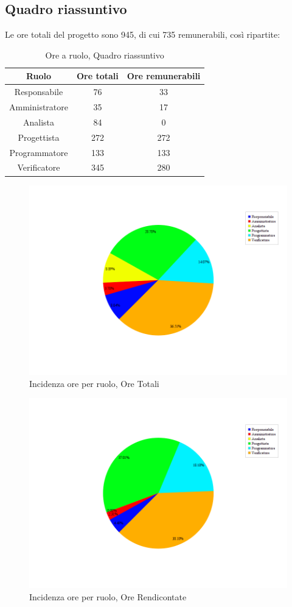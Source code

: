 \subsection{Quadro riassuntivo}
Le ore totali del progetto sono 945, di cui 735 remunerabili, così ripartite:
\begin{table}[H]
	\begin{center}
		\begin{tabular}{|c|c|c|}
			\hline
			\textbf{Ruolo}	& \textbf{Ore totali} & \textbf{Ore remunerabili} \\
			\hline
			Responsabile	&	76	&	33	\\
			\hline
			Amministratore	&	35	&	17	\\
			\hline
			Analista		&	84	&	0	\\
			\hline
			Progettista		&	272	&	272	\\
			\hline
			Programmatore	&	133	&	133	\\
			\hline
			Verificatore	&	345	&	280	\\
			\hline
		\end{tabular}
	\end{center}
	\caption{Ore a ruolo, Quadro riassuntivo}
\end{table}

\begin{figure}[H]
	\centering
	\includegraphics[scale=0.3]{immagini/Grafi/OreRuoloOreTotali}
	\caption{Incidenza ore per ruolo, Ore Totali}
\end{figure}

\begin{figure}[H]
	\centering
	\includegraphics[scale=0.3]{immagini/Grafi/OreRuoloRendicontabili}
	\caption{Incidenza ore per ruolo, Ore Rendicontate}
\end{figure}
